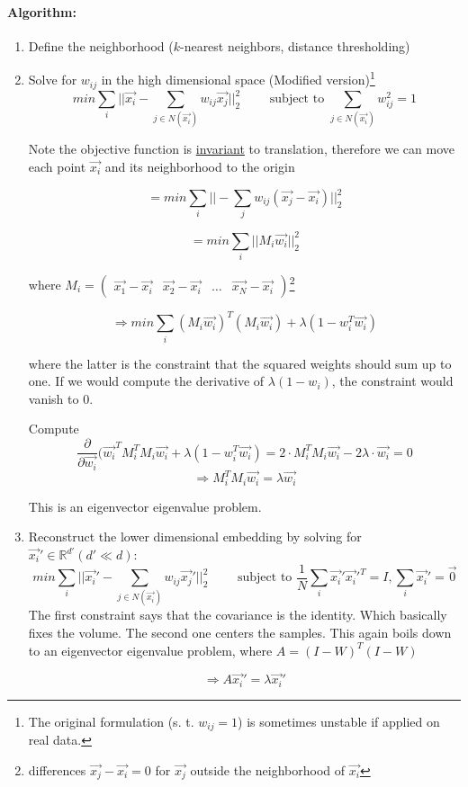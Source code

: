\paragraph{Algorithm:}
\begin{enumerate}
    \item Define the neighborhood (\(k\)-nearest neighbors, distance thresholding)

    \item Solve for \(w_{ij}\) in the high dimensional space (Modified version)\footnote{The original formulation (s. t. $ w_{ij} = 1$) is sometimes unstable if applied on real data.}
        \[min \sum_{i}||\vec{x_i} - \sum_{j\in N(\vec{x_i})} w_{ij} \vec{x_j}||_2^2 \qquad \text{ subject to } \sum_{j \in N(\vec{x_i})} w_{ij}^2 = 1\]


        Note the objective function is \underline{invariant} to translation, therefore we can move each point $\vec{x_i}$ and its neighborhood to the origin

        \begin{equation*}
            = min \sum_{i} ||- \sum_j w_{ij} (\vec{x_j} - \vec{x_i})||_2^2
        \end{equation*}

        \begin{equation*}
          = min \sum_{i} ||M_i\vec{w_i}||_2^2
        \end{equation*}

        where $M_i = \left(\begin{array}{cccc} \vec{x_1} - \vec{x_i} & \vec{x_2} - \vec{x_i}& \dots& \vec{x_N} - \vec{x_i} \end{array}\right)$\footnote{differences \(\vec{x_j} - \vec{x_i} = 0\) for \(\vec{x_j}\) outside the neighborhood of \(\vec{x_i}\)}

        \[\Rightarrow min \sum_{i} (M_i \vec{w_i})^T (M_i \vec{w_i}) + \lambda(1-w_i^T \vec{w_i})\]

        where the latter is the constraint that the squared weights should sum up to one. If we would compute the derivative of \(\lambda(1-w_i)\), the constraint would vanish to \(0\).

        Compute
        \[\frac{\partial}{\partial \vec{w_i}} (\vec{w_i}^T M_i^T M_i \vec{w_i} + \lambda(1-w_i^T \vec{w_i})=  2 \cdot M_i^T M_i \vec{w_i} - 2 \lambda  \cdot \vec{w_i} = 0\]
        \[\Rightarrow \boxed{M_i^T M_i \vec{w_i} = \lambda \vec{w_i}}\]

        This is an eigenvector eigenvalue problem.

    \item Reconstruct the lower dimensional embedding by solving for \(\vec{x_i}' \in \mathbb{R}^{d'} (d' \ll d)\):
        \[min \sum_i ||\vec{x_i}' - \sum_{j \in N(\vec{x_i})} w_{ij} \vec{x_j}'||_2^2 \qquad \text{ subject to } \frac{1}{N} \sum_i \vec{x_i}' \vec{x_i}'^T = I, \sum_i \vec{x_i}' = \vec{0}\]
        The first constraint says that the covariance is the identity. Which basically fixes the volume. The second one centers the samples. This again boils down to an eigenvector eigenvalue problem, where $A = (I - W)^T (I - W)$

          \[\Rightarrow \boxed{A \vec{x_i}' = \lambda \vec{x_i}'}\]
\end{enumerate}
